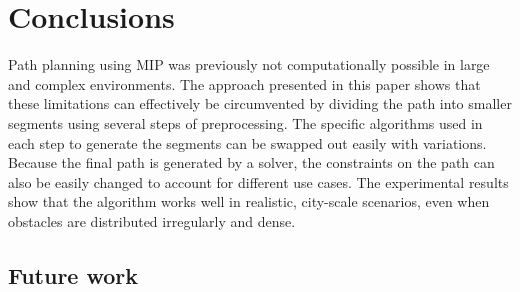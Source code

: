 

\chapter{Conclusions}
\label{section:conclusions}
Path planning using MIP was previously not computationally possible in large and complex environments. The approach presented in this paper shows that these limitations can effectively be circumvented by dividing the path into smaller segments using several steps of preprocessing. The specific algorithms used in each step to generate the segments can be swapped out easily with variations. Because the final path is generated by a solver, the constraints on the path can also be easily changed to account for different use cases. The experimental results show that the algorithm works well in realistic, city-scale scenarios, even when obstacles are distributed irregularly and dense.
\section{Future work}


%
%


